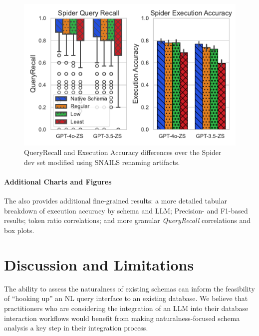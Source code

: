 \begin{figure}
  \centering
  \includegraphics[width=\figwidthmod\linewidth]{figures/spider-combined-results.pdf}
  \caption{QueryRecall and Execution Accuracy differences over the Spider~\cite{Yu&al.18c} dev set modified using SNAILS renaming artifacts.}
  \label{fig:spiderresults}
\end{figure}

\paragraph{\textbf{Additional Charts and Figures}}
The \fi also provides additional fine-grained results: a more detailed tabular breakdown of execution accuracy by schema and LLM; Precision- and F1-based results; token ratio correlations; and more granular \emph{QueryRecall} correlations and box plots.


\section{Discussion and Limitations}


The ability to assess the naturalness of existing schemas can inform the feasibility of ``hooking up'' an NL query interface to an existing database.
We believe that practitioners who are considering the integration of an LLM into their database interaction workflows would benefit from making naturalness-focused schema analysis a key step in their integration process.

